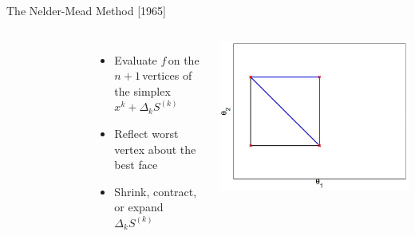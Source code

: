 \documentclass[handout,aspectratio=54]{beamer}
\numberwithin{theorem}{section}
\begin{document}
\begin{frame}{The Nelder-Mead Method [1965]}
\begin{columns}
\colorbox[rgb]{0.5,0.6,0.7}{\textcolor{white}{Basic iteration($k\ge0$):}}
\begin{itemize}\footnotesize
\item Evaluate $f$\,on the $n+1$\,vertices of the simplex\,$x^k+\Delta_kS^{(k)}$
\item Reflect worst vertex about the best face
\item Shrink, contract, or expand\,$\Delta_kS^{(k)}$
\end{itemize}

\includegraphics[width=\textwidth]{fig/18-2.jpg}
\end{columns}

\vspace{2.4cm}
\end{frame}
\end{document}
